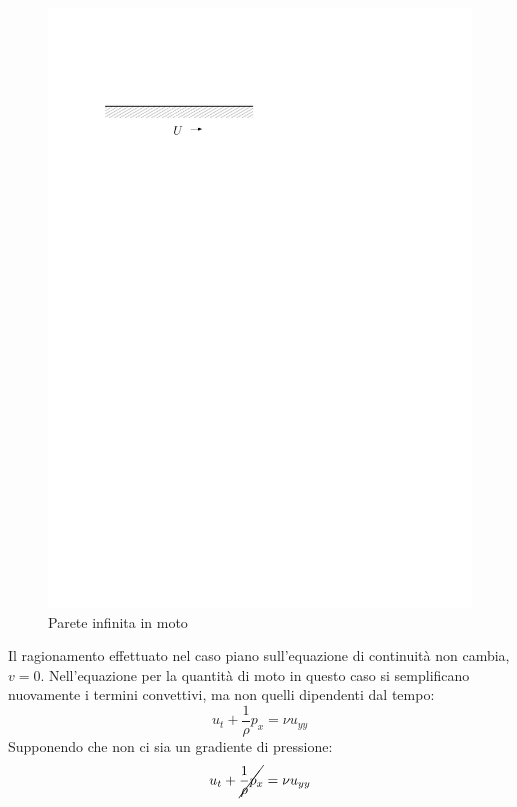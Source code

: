 	\begin{figure}[ht]
		\includegraphics[scale=0.9]{./3.6 Soluzioni esatte equazioni di Navier-Stokes/3.6-10}
		\centering
		\caption{Parete infinita in moto}
	\end{figure}
%

Il ragionamento effettuato nel caso piano sull'equazione di continuità non cambia, $v = 0$.
Nell'equazione per la quantità di moto in questo caso si semplificano nuovamente i termini convettivi, ma non quelli dipendenti dal tempo:
%
	\begin{equation*}
		u_t + \frac{1}{\rho} p_x = \nu u_{yy}
	\end{equation*}
%
Supponendo che non ci sia un gradiente di pressione:
%
	\begin{equation*}
		u_t + \cancel{\frac{1}{\rho} p_x} = \nu u_{yy}
	\end{equation*}
%

